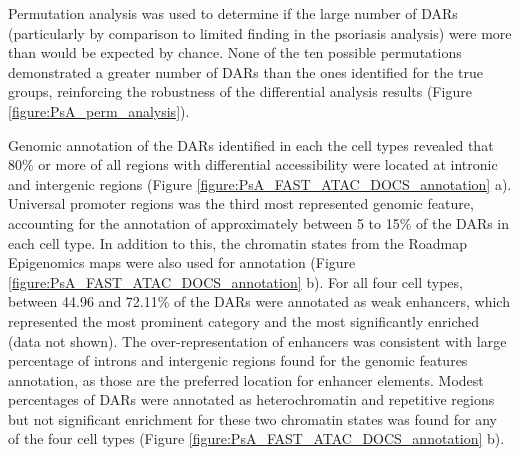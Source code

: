 Permutation analysis was used to determine if the large number of DARs (particularly by comparison to limited finding in the psoriasis analysis) were more than would be expected by chance. None of the ten possible permutations demonstrated a greater number of DARs than the ones identified for the true groups, reinforcing the robustness of the differential analysis results (Figure \ref{figure:PsA_perm_analysis}).

  
Genomic annotation of the DARs identified in each the cell types revealed that 80\% or more of all regions with differential accessibility were located at intronic and intergenic regions (Figure \ref{figure:PsA_FAST_ATAC_DOCS_annotation} a). Universal promoter regions was the third most represented genomic feature, accounting for the annotation of approximately between 5 to 15\% of the DARs in each cell type. In addition to this, the chromatin states from the Roadmap Epigenomics maps were also used for annotation (Figure \ref{figure:PsA_FAST_ATAC_DOCS_annotation} b). For all four cell types,  between 44.96 and 72.11\% of the DARs were annotated as weak enhancers, which represented the most prominent category and the most significantly enriched (data not shown). The over-representation of enhancers was consistent with large percentage of introns and intergenic regions found for the genomic features annotation, as those are the preferred location for enhancer elements. Modest percentages of DARs were annotated as heterochromatin and repetitive regions but not significant enrichment for these two chromatin states was found for any of the four cell types (Figure \ref{figure:PsA_FAST_ATAC_DOCS_annotation} b).
%

